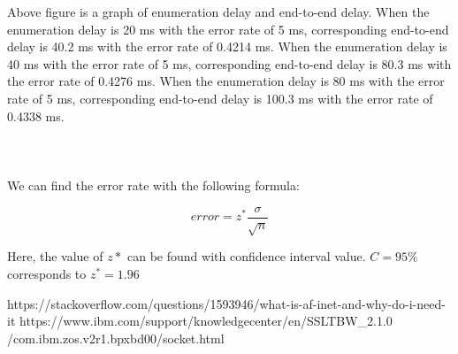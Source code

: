 \documentclass[conference]{IEEEtran}
\begin{document}
Above figure is a graph of enumeration delay and end-to-end delay. When the enumeration delay is 20 ms with the error rate of 5 ms, corresponding end-to-end delay is 40.2 ms with the error rate of 0.4214 ms. When the enumeration delay is 40 ms with the error rate of 5 ms, corresponding end-to-end delay is 80.3 ms with the error rate of 0.4276 ms. When the enumeration delay is 80 ms with the error rate of 5 ms, corresponding end-to-end delay is 100.3 ms with the error rate of 0.4338 ms. \\ \\ \\ \\
We can find the error rate with the following formula:

\begin{equation}
error = z^*\dfrac{\sigma}{\sqrt{n}}
\end{equation}

Here, the value of $z*$ can be found with confidence interval value.
$C = 95\% $ corresponds to $z^* = 1.96$ \\

\begin{thebibliography}{00}
 https://stackoverflow.com/questions/1593946/what-is-af-inet-and-why-do-i-need-it
 https://www.ibm.com/support/knowledgecenter/en/SSLTBW\_2.1.0\\/com.ibm.zos.v2r1.bpxbd00/socket.html
\end{thebibliography}
\end{document}
